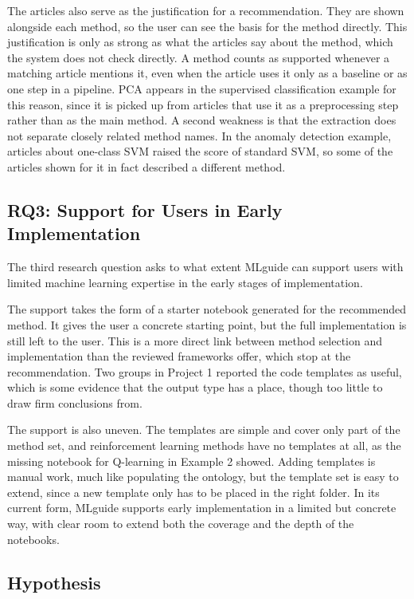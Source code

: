 The articles also serve as the justification for a 
recommendation. They are shown alongside each method, so the 
user can see the basis for the method directly. This justification is 
only as strong as what the articles say about the method, which 
the system does not check directly. A method counts as supported whenever 
a matching article mentions it, even when the article uses it 
only as a baseline or as one step in a pipeline. PCA appears 
in the supervised classification 
example for this reason, since it is picked up from articles 
that use it as a preprocessing step rather than as the main 
method. A second weakness is that the extraction does not separate closely 
related method names. In the anomaly detection example, articles about 
one-class SVM raised the score of standard SVM, so 
some of the articles shown for it in fact described a different 
method. 

\subsection{RQ3: Support for Users in Early Implementation}

The third research question asks to what extent MLguide can 
support users with limited machine learning expertise in the 
early stages of implementation.

The support takes the form of a starter notebook generated for 
the recommended method. It gives the user a concrete starting point, 
but the full implementation is 
still left to the user. This is a more direct link between method selection and 
implementation than the reviewed frameworks offer, which stop at the 
recommendation. Two groups in Project 1 reported the code 
templates as useful, which 
is some evidence that the output type has a place, though too 
little to draw firm conclusions from.

The support is also uneven. The templates are simple and cover 
only part of the method set, and reinforcement learning methods 
have no templates at all, as the missing notebook for Q-learning 
in Example 2 showed. Adding templates is manual work, 
much like populating the ontology, 
but the template set is easy to extend, 
since a new template only has to be placed in the right 
folder. In its current form, MLguide supports early 
implementation in a limited but concrete way, with clear room to 
extend both the coverage and the depth of the notebooks.

\subsection{Hypothesis}

